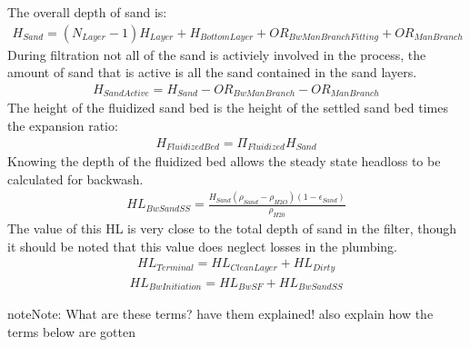 \documentclass[letterpaper,10pt,english]{sphinxmanual}
\begin{document}
The overall depth of sand is:
\begin{equation}\label{equation:Filtration/Filtration_Derivations:Filtration/Filtration_Derivations:57}
\begin{split}H_{Sand} = (N_{Layer} - 1)H_{Layer} + H_{BottomLayer} + OR_{BwManBranchFitting} + OR_{ManBranch}\end{split}
\end{equation}
During filtration not all of the sand is activiely involved in the process, the amount of sand that is active is all the sand contained in the sand layers.
\begin{equation}\label{equation:Filtration/Filtration_Derivations:Filtration/Filtration_Derivations:58}
\begin{split}H_{SandActive} = H_{Sand} - OR_{BwManBranch} - OR_{ManBranch}\end{split}
\end{equation}
The height of the fluidized sand bed is the height of the settled sand bed times the expansion ratio:
\begin{equation}\label{equation:Filtration/Filtration_Derivations:Filtration/Filtration_Derivations:59}
\begin{split}H_{FluidizedBed} = \Pi_{Fluidized} H_{Sand}\end{split}
\end{equation}
Knowing the depth of the fluidized bed allows the steady state headloss to be calculated for backwash.
\begin{equation}\label{equation:Filtration/Filtration_Derivations:Filtration/Filtration_Derivations:60}
\begin{split}HL_{BwSandSS} = \frac{H_{Sand}(\rho_{Sand} - \rho_{H2O})(1 - \epsilon_{Sand})}  {\rho_{H20}}\end{split}
\end{equation}
The value of this HL is very close to the total depth of sand in the filter, though it should be noted that this value does neglect losses in the plumbing.
\begin{equation}\label{equation:Filtration/Filtration_Derivations:Filtration/Filtration_Derivations:61}
\begin{split}HL_{Terminal} = HL_{CleanLayer} + HL_{Dirty}\end{split}
\end{equation}\begin{equation}\label{equation:Filtration/Filtration_Derivations:Filtration/Filtration_Derivations:62}
\begin{split}HL_{BwInitiation} = HL_{BwSF} + HL_{BwSandSS}\end{split}
\end{equation}
\begin{sphinxadmonition}{note}{Note:}
What are these terms? have them explained! also explain how the terms below are gotten
\end{sphinxadmonition}
\end{document}
